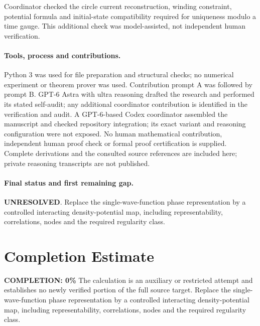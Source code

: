 \documentclass[11pt]{article}
\begin{document}
Coordinator checked the circle current reconstruction, winding constraint, potential formula and initial-state compatibility required for uniqueness modulo a time gauge. This additional check was model-assisted, not independent human verification.

\paragraph{Tools, process and contributions.}
Python 3 was used for file preparation and structural checks; no numerical experiment or theorem prover was used. Contribution prompt A was followed by prompt B. GPT-6 Astra with ultra reasoning drafted the research and performed its stated self-audit; any additional coordinator contribution is identified in the verification and audit. A GPT-6-based Codex coordinator assembled the manuscript and checked repository integration; its exact variant and reasoning configuration were not exposed. No human mathematical contribution, independent human proof check or formal proof certification is supplied. Complete derivations and the consulted source references are included here; private reasoning transcripts are not published.

\paragraph{Final status and first remaining gap.}
\textbf{UNRESOLVED}. Replace the single-wave-function phase representation by a controlled interacting density-potential map, including representability, correlations, nodes and the required regularity class.

\section{Completion Estimate}
\noindent\textbf{COMPLETION: 0\%}
The calculation is an auxiliary or restricted attempt and establishes no newly verified portion of the full source target. Replace the single-wave-function phase representation by a controlled interacting density-potential map, including representability, correlations, nodes and the required regularity class.
\end{document}
